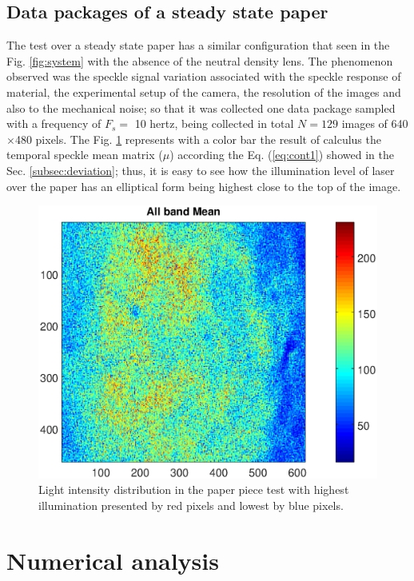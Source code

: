 \documentclass[review]{elsarticle}
\begin{document}
\subsection{Data packages of a steady state paper}
\label{sec:descriptionpaper}
The test over a steady state paper has a similar configuration that seen in
the Fig. \ref{fig:system} with the absence of 
the neutral density lens. 
The phenomenon observed was the speckle signal  variation associated with  the speckle response of material, 
the experimental setup of the camera, the resolution of the images and also to the mechanical noise; 
so that it was collected one data package sampled with a frequency of $F_s=$ 10 hertz, being 
collected in total $N=129$ images of 640$\times$480 pixels.
The Fig. \ref{fig:meanpaper} represents
with a color bar the result of  calculus the temporal speckle mean matrix ($\mu$) according the Eq. (\ref{eq:cont1})
showed in the Sec. \ref{subsec:deviation}; thus, it is easy to see how the
illumination level of laser over the paper has an elliptical form being highest 
close to the top of the image.
\begin{figure}[h!]
\centering
\includegraphics[width=0.85\columnwidth]{meanall.eps}
\caption{Light intensity distribution in the paper piece test with highest illumination 
presented by red pixels and lowest by blue pixels.}
\label{fig:meanpaper}
\end{figure}

\section{Numerical analysis}
\label{sec:analysis}
\end{document}
